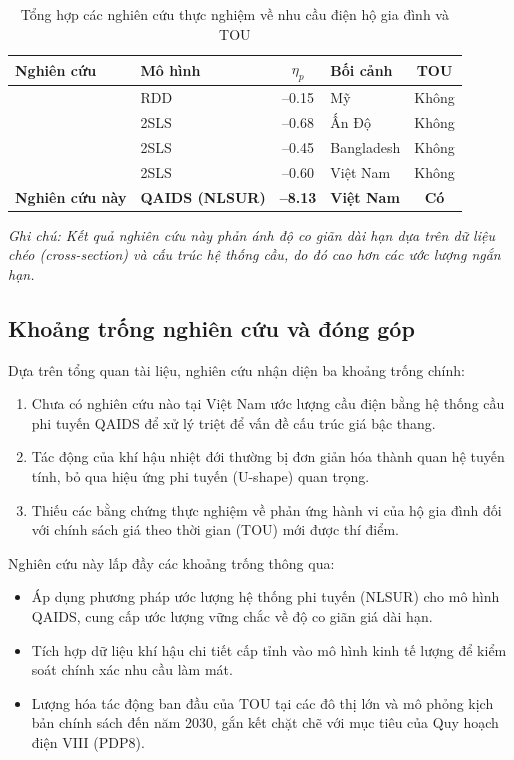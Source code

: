 \documentclass[12pt,a4paper,oneside]{article}
\begin{document}
	\begin{table}[H]
		\centering
		\caption{Tổng hợp các nghiên cứu thực nghiệm về nhu cầu điện hộ gia đình và TOU}
		\begin{tabular}{l l c l c}
			\toprule
			\textbf{Nghiên cứu} & \textbf{Mô hình} & $\eta_p$ & \textbf{Bối cảnh} & \textbf{TOU} \\
			\midrule
			\parencite{ito2014} & RDD & –0.15 & Mỹ & Không \\
			\parencite{filippini2016} & 2SLS & –0.68 & Ấn Độ & Không \\
			\parencite{balarama2020} & 2SLS & –0.45 & Bangladesh & Không \\
			\parencite{le2020} & 2SLS & –0.60 & Việt Nam & Không \\
			\textbf{Nghiên cứu này} & \textbf{QAIDS (NLSUR)} & \textbf{–8.13} & \textbf{Việt Nam} & \textbf{Có} \\
			\bottomrule
		\end{tabular}
		\footnotesize{\textit{Ghi chú: Kết quả nghiên cứu này phản ánh độ co giãn dài hạn dựa trên dữ liệu chéo (cross-section) và cấu trúc hệ thống cầu, do đó cao hơn các ước lượng ngắn hạn.}}
	\end{table}
	
	\subsection{Khoảng trống nghiên cứu và đóng góp}
	
	Dựa trên tổng quan tài liệu, nghiên cứu nhận diện ba khoảng trống chính:
	\begin{enumerate}
		\item Chưa có nghiên cứu nào tại Việt Nam ước lượng cầu điện bằng hệ thống cầu phi tuyến QAIDS để xử lý triệt để vấn đề cấu trúc giá bậc thang.
		\item Tác động của khí hậu nhiệt đới thường bị đơn giản hóa thành quan hệ tuyến tính, bỏ qua hiệu ứng phi tuyến (U-shape) quan trọng.
		\item Thiếu các bằng chứng thực nghiệm về phản ứng hành vi của hộ gia đình đối với chính sách giá theo thời gian (TOU) mới được thí điểm.
	\end{enumerate}
	
	Nghiên cứu này lấp đầy các khoảng trống thông qua:
	\begin{itemize}
		\item Áp dụng phương pháp ước lượng hệ thống phi tuyến (NLSUR) cho mô hình QAIDS, cung cấp ước lượng vững chắc về độ co giãn giá dài hạn.
		\item Tích hợp dữ liệu khí hậu chi tiết cấp tỉnh vào mô hình kinh tế lượng để kiểm soát chính xác nhu cầu làm mát.
		\item Lượng hóa tác động ban đầu của TOU tại các đô thị lớn và mô phỏng kịch bản chính sách đến năm 2030, gắn kết chặt chẽ với mục tiêu của Quy hoạch điện VIII (PDP8).
	\end{itemize}
	
\end{document}
